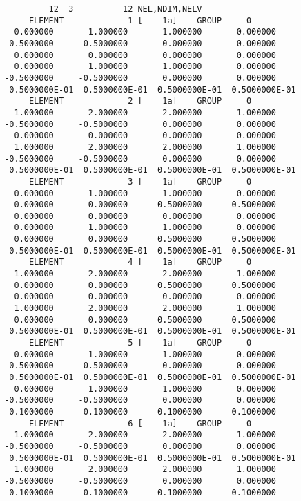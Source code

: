 \scriptsize
\begin{verbatim}
          12  3          12 NEL,NDIM,NELV
      ELEMENT             1 [    1a]    GROUP     0
   0.000000       1.000000       1.000000       0.000000    
 -0.5000000     -0.5000000       0.000000       0.000000    
   0.000000       0.000000       0.000000       0.000000    
   0.000000       1.000000       1.000000       0.000000    
 -0.5000000     -0.5000000       0.000000       0.000000    
  0.5000000E-01  0.5000000E-01  0.5000000E-01  0.5000000E-01
      ELEMENT             2 [    1a]    GROUP     0
   1.000000       2.000000       2.000000       1.000000    
 -0.5000000     -0.5000000       0.000000       0.000000    
   0.000000       0.000000       0.000000       0.000000    
   1.000000       2.000000       2.000000       1.000000    
 -0.5000000     -0.5000000       0.000000       0.000000    
  0.5000000E-01  0.5000000E-01  0.5000000E-01  0.5000000E-01
      ELEMENT             3 [    1a]    GROUP     0
   0.000000       1.000000       1.000000       0.000000    
   0.000000       0.000000      0.5000000      0.5000000    
   0.000000       0.000000       0.000000       0.000000    
   0.000000       1.000000       1.000000       0.000000    
   0.000000       0.000000      0.5000000      0.5000000    
  0.5000000E-01  0.5000000E-01  0.5000000E-01  0.5000000E-01
      ELEMENT             4 [    1a]    GROUP     0
   1.000000       2.000000       2.000000       1.000000    
   0.000000       0.000000      0.5000000      0.5000000    
   0.000000       0.000000       0.000000       0.000000    
   1.000000       2.000000       2.000000       1.000000    
   0.000000       0.000000      0.5000000      0.5000000    
  0.5000000E-01  0.5000000E-01  0.5000000E-01  0.5000000E-01
      ELEMENT             5 [    1a]    GROUP     0
   0.000000       1.000000       1.000000       0.000000    
 -0.5000000     -0.5000000       0.000000       0.000000    
  0.5000000E-01  0.5000000E-01  0.5000000E-01  0.5000000E-01
   0.000000       1.000000       1.000000       0.000000    
 -0.5000000     -0.5000000       0.000000       0.000000    
  0.1000000      0.1000000      0.1000000      0.1000000    
      ELEMENT             6 [    1a]    GROUP     0
   1.000000       2.000000       2.000000       1.000000    
 -0.5000000     -0.5000000       0.000000       0.000000    
  0.5000000E-01  0.5000000E-01  0.5000000E-01  0.5000000E-01
   1.000000       2.000000       2.000000       1.000000    
 -0.5000000     -0.5000000       0.000000       0.000000    
  0.1000000      0.1000000      0.1000000      0.1000000    

\end{verbatim}
